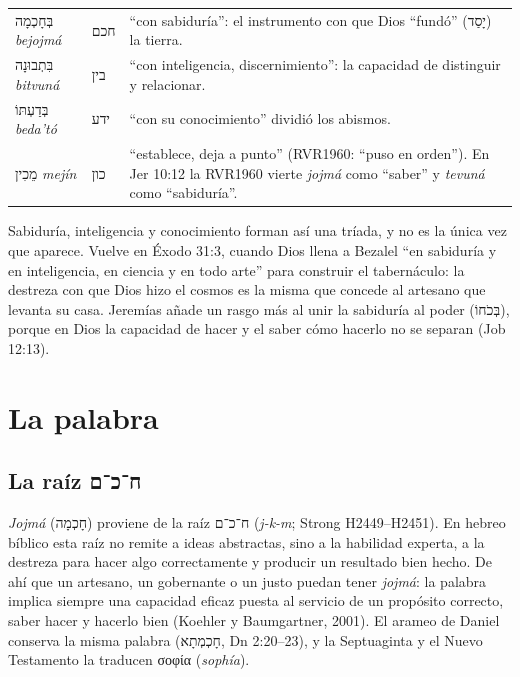 \documentclass[11pt,letterpaper]{article}
\newcommand{\heb}[1]{\mbox{\foreignlanguage{hebrew}{#1}}}
\newcommand{\grc}[1]{\foreignlanguage{ancientgreek}{#1}}
\begin{document}
\begin{filologia}[Pr 3:19--20 y Jer 10:12]
\begin{tabular}{@{}L{3.2cm}L{1.6cm}L{10cm}@{}}
\heb{בְּחָכְמָה} \emph{bejojmá} & \heb{חכם} & ``con sabiduría'': el instrumento con que Dios ``fundó'' (\heb{יָסַד}) la tierra. \\[2pt]
\heb{בִּתְבוּנָה} \emph{bitvuná} & \heb{בין} & ``con inteligencia, discernimiento'': la capacidad de distinguir y relacionar. \\[2pt]
\heb{בְּדַעְתּוֹ} \emph{beda'tó} & \heb{ידע} & ``con su conocimiento'' dividió los abismos. \\[2pt]
\heb{מֵכִין} \emph{mejín} & \heb{כון} & ``establece, deja a punto'' (RVR1960: ``puso en orden''). En Jer 10:12 la RVR1960 vierte \emph{jojmá} como ``saber'' y \emph{tevuná} como ``sabiduría''. \\
\end{tabular}
\end{filologia}

Sabiduría, inteligencia y conocimiento forman así una tríada, y no es la única vez que aparece. Vuelve en Éxodo 31:3, cuando Dios llena a Bezalel ``en sabiduría y en inteligencia, en ciencia y en todo arte'' para construir el tabernáculo: la destreza con que Dios hizo el cosmos es la misma que concede al artesano que levanta su casa. Jeremías añade un rasgo más al unir la sabiduría al poder (\heb{בְּכֹחוֹ}), porque en Dios la capacidad de hacer y el saber cómo hacerlo no se separan (Job 12:13).

\section{La palabra}

\subsection{La raíz \heb{ח־כ־ם}}

\emph{Jojmá} (\heb{חָכְמָה}) proviene de la raíz \heb{ח־כ־ם} (\emph{j-k-m}; Strong H2449--H2451). En hebreo bíblico esta raíz no remite a ideas abstractas, sino a la habilidad experta, a la destreza para hacer algo correctamente y producir un resultado bien hecho. De ahí que un artesano, un gobernante o un justo puedan tener \emph{jojmá}: la palabra implica siempre una capacidad eficaz puesta al servicio de un propósito correcto, saber hacer y hacerlo bien (Koehler y Baumgartner, 2001). El arameo de Daniel conserva la misma palabra (\heb{חָכְמְתָא}, Dn 2:20--23), y la Septuaginta y el Nuevo Testamento la traducen \grc{σοφία} (\emph{sophía}).
\end{document}
